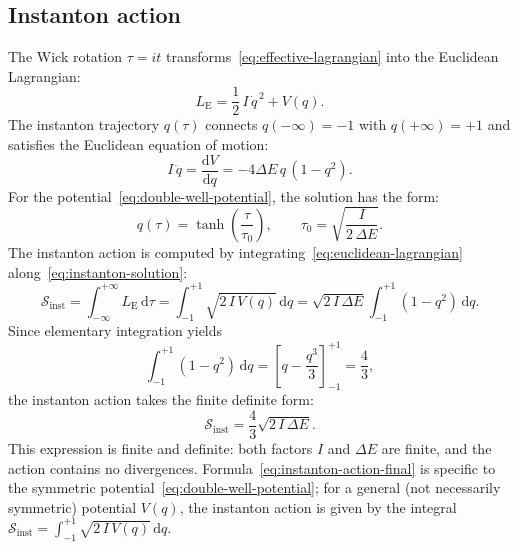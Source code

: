 \documentclass[12pt,a4paper,preprint]{elsarticle}
\begin{document}
        \subsection{Instanton action}\label{subsec:instanton-action}
            The Wick rotation $\tau = it$ transforms~\eqref{eq:effective-lagrangian} into the Euclidean Lagrangian:
            \begin{equation}
                L_{\mathrm{E}} = \frac{1}{2}\,I\,\dot{q}^{\,2} + V(q).
                \label{eq:euclidean-lagrangian}
            \end{equation}
            The instanton trajectory $q(\tau)$ connects $q(-\infty) = -1$ with $q(+\infty) = +1$ and satisfies the Euclidean equation of motion:
            \begin{equation}
                I\,\ddot{q} = \frac{\mathrm{d}V}{\mathrm{d}q} = -4\Delta E\,q\,(1 - q^{2}).
                \label{eq:euclidean-eom}
            \end{equation}
            For the potential~\eqref{eq:double-well-potential}, the solution has the form:
            \begin{equation}
                q(\tau) = \tanh\left(\frac{\tau}{\tau_{0}}\right), \qquad \tau_{0} = \sqrt{\frac{I}{2\,\Delta E}}.
                \label{eq:instanton-solution}
            \end{equation}
            The instanton action is computed by integrating~\eqref{eq:euclidean-lagrangian} along~\eqref{eq:instanton-solution}:
            \begin{equation}
                \mathcal{S}_{\mathrm{inst}} = \int_{-\infty}^{+\infty} L_{\mathrm{E}}\,\mathrm{d}\tau = \int_{-1}^{+1}\sqrt{2\,I\,V(q)}\,\mathrm{d}q = \sqrt{2\,I\,\Delta E} \int_{-1}^{+1} (1 - q^{2})\,\mathrm{d}q.
                \label{eq:instanton-action-integral}
            \end{equation}
            Since elementary integration yields
            \begin{equation}
                \int_{-1}^{+1} (1 - q^{2})\,\mathrm{d}q = \left[ q - \frac{q^{3}}{3} \right]_{-1}^{+1} = \frac{4}{3},
                \label{eq:q-integral}
            \end{equation}
            the instanton action takes the finite definite form:
            \begin{equation}
                \mathcal{S}_{\mathrm{inst}} = \frac{4}{3}\sqrt{2\,I\,\Delta E}.
                \label{eq:instanton-action-final}
            \end{equation}
            This expression is finite and definite: both factors $I$ and $\Delta E$ are finite, and the action contains no divergences. Formula~\eqref{eq:instanton-action-final} is specific to the symmetric potential~\eqref{eq:double-well-potential}; for a general (not necessarily symmetric) potential $V(q)$, the instanton action is given by the integral $\mathcal{S}_{\mathrm{inst}} = \int_{-1}^{+1}\sqrt{2\,I\,V(q)}\,\mathrm{d}q$.
\end{document}
